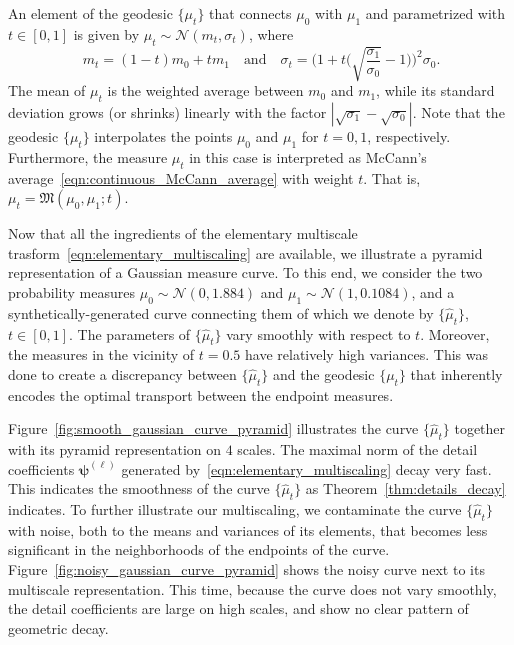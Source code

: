 \documentclass[12pt]{amsart}
\begin{document}
An element of the geodesic $\{\mu_t\}$ that connects $\mu_0$ with $\mu_1$ and parametrized with $t\in[0, 1]$ is given by $\mu_t\sim\mathcal{N}(m_t, \sigma_t)$, where
\begin{equation}~\label{eqn:Gaussian_geodesic}
        m_t = (1-t)m_0+tm_1 \quad \text{and} \quad \sigma_t = \big(1 + t\big(\sqrt{\frac{\sigma_1}{\sigma_0}}-1\big)\big)^2\sigma_0.
\end{equation}
The mean of $\mu_t$ is the weighted average between $m_0$ and $m_1$, while its standard deviation grows (or shrinks) linearly with the factor $|\sqrt{\sigma_1}-\sqrt{\sigma_0}|$. Note that the geodesic $\{\mu_t\}$ interpolates the points $\mu_0$ and $\mu_1$ for $t=0, 1$, respectively. Furthermore, the measure $\mu_t$ in this case is interpreted as McCann's average~\eqref{eqn:continuous_McCann_average} with weight $t$. That is, $\mu_t=\mathfrak{M}(\mu_0,\mu_1;t)$.

Now that all the ingredients of the elementary multiscale trasform~\eqref{eqn:elementary_multiscaling} are available, we illustrate a pyramid representation of a Gaussian measure curve. To this end, we consider the two probability measures $\mu_0\sim\mathcal{N}(0, 1.884)$ and $\mu_1\sim\mathcal{N}(1,0.1084)$, and a synthetically-generated curve connecting them of which we denote by $\{\widehat{\mu}_t\}$, $t\in[0, 1]$. The parameters of $\{\widehat{\mu}_t\}$ vary smoothly with respect to $t$. Moreover, the measures in the vicinity of $t=0.5$ have relatively high variances. This was done to create a discrepancy between $\{\widehat{\mu}_t\}$ and the geodesic $\{{\mu}_t\}$ that inherently encodes the optimal transport between the endpoint measures.

Figure~\ref{fig:smooth_gaussian_curve_pyramid} illustrates the curve $\{\widehat{\mu}_t\}$ together with its pyramid representation on $4$ scales. The maximal norm of the detail coefficients $\boldsymbol{\psi}^{(\ell)}$ generated by~\eqref{eqn:elementary_multiscaling} decay very fast. This indicates the smoothness of the curve $\{\widehat{\mu}_t\}$ as Theorem~\ref{thm:details_decay} indicates. To further illustrate our multiscaling, we contaminate the curve $\{\widehat{\mu}_t\}$ with noise, both to the means and variances of its elements, that becomes less significant in the neighborhoods of the endpoints of the curve. Figure~\ref{fig:noisy_gaussian_curve_pyramid} shows the noisy curve next to its multiscale representation. This time, because the curve does not vary smoothly, the detail coefficients are large on high scales, and show no clear pattern of geometric decay.
\end{document}
